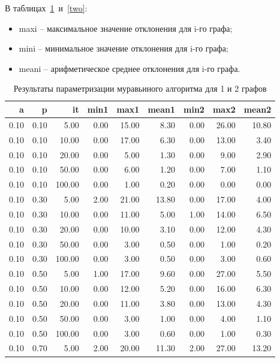 \documentclass{bmstu}
\begin{document}

    В таблицах~\ref{one}~и~\ref{two}:
\begin{itemize}
    \item maxi -- максимальное значение отклонения для i-го графа;
    \item mini -- минимальное значение отклонения для i-го графа;
    \item meani -- арифметическое среднее отклонения для i-го графа.
\end{itemize}

\begin{longtable}{|r|r|r|r|r|r|r|r|r|}
\caption{Результаты параметризации муравьиного алгоритма для 1 и 2 графов}
\label{one}
\hline
a & p & it & min1 & max1 & mean1 & min2 & max2 & mean2 \\ \hline
0.10 & 0.10 & 5.00 & 0.00 & 15.00 & 8.30 & 0.00 & 26.00 & 10.80 \\ \hline
0.10 & 0.10 & 10.00 & 0.00 & 17.00 & 6.30 & 0.00 & 13.00 & 3.40 \\ \hline
0.10 & 0.10 & 20.00 & 0.00 & 5.00 & 1.30 & 0.00 & 9.00 & 2.90 \\ \hline
0.10 & 0.10 & 50.00 & 0.00 & 6.00 & 1.20 & 0.00 & 7.00 & 1.10 \\ \hline
0.10 & 0.10 & 100.00 & 0.00 & 1.00 & 0.20 & 0.00 & 0.00 & 0.00 \\ \hline
0.10 & 0.30 & 5.00 & 2.00 & 21.00 & 13.80 & 0.00 & 17.00 & 4.00 \\ \hline
0.10 & 0.30 & 10.00 & 0.00 & 11.00 & 5.00 & 1.00 & 14.00 & 6.50 \\ \hline
0.10 & 0.30 & 20.00 & 0.00 & 10.00 & 3.10 & 0.00 & 12.00 & 4.30 \\ \hline
0.10 & 0.30 & 50.00 & 0.00 & 3.00 & 0.50 & 0.00 & 1.00 & 0.20 \\ \hline
0.10 & 0.30 & 100.00 & 0.00 & 3.00 & 0.50 & 0.00 & 3.00 & 0.60 \\ \hline
0.10 & 0.50 & 5.00 & 1.00 & 17.00 & 9.60 & 0.00 & 27.00 & 5.50 \\ \hline
0.10 & 0.50 & 10.00 & 0.00 & 12.00 & 5.20 & 0.00 & 16.00 & 6.30 \\ \hline
0.10 & 0.50 & 20.00 & 0.00 & 11.00 & 3.80 & 0.00 & 13.00 & 4.30 \\ \hline
0.10 & 0.50 & 50.00 & 0.00 & 3.00 & 1.00 & 0.00 & 4.00 & 1.10 \\ \hline
0.10 & 0.50 & 100.00 & 0.00 & 3.00 & 0.60 & 0.00 & 1.00 & 0.30 \\ \hline
0.10 & 0.70 & 5.00 & 2.00 & 20.00 & 11.30 & 2.00 & 27.00 & 13.20 \\ \hline

\end{longtable}
\end{document}
